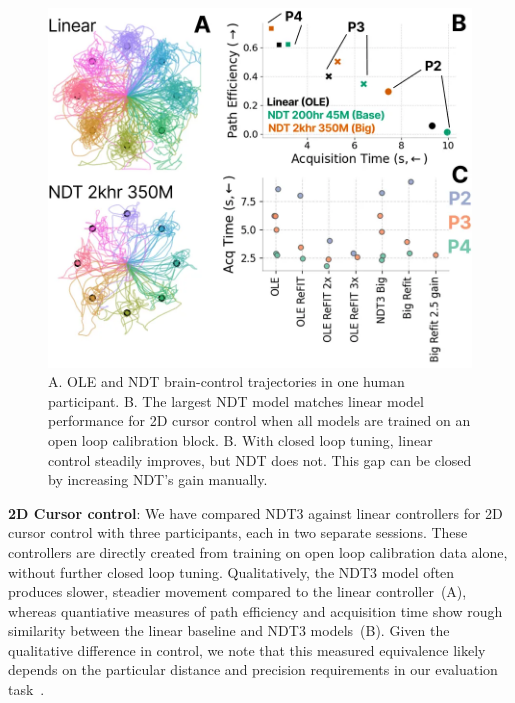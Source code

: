\documentclass[12pt,oneside]{report}
\begin{document}
\begin{figure}[h]
  \centering
  \includegraphics[width=0.8\linewidth]{ch3_cursor_control.png}
  \caption{A. OLE and NDT brain-control trajectories in one human participant. B. The largest NDT model matches linear model performance for 2D cursor control when all models are trained on an open loop calibration block. B. With closed loop tuning, linear control steadily improves, but NDT does not. This gap can be closed by increasing NDT's gain manually.}
  \label{fig:cursor}
\end{figure}

\textbf{2D Cursor control}: We have compared NDT3 against linear controllers for 2D cursor control with three participants, each in two separate sessions. These controllers are directly created from training on open loop calibration data alone, without further closed loop tuning. Qualitatively, the NDT3 model often produces slower, steadier movement compared to the linear controller~(A), whereas quantiative measures of path efficiency and acquisition time show rough similarity between the linear baseline and NDT3 models~(B). Given the qualitative difference in control, we note that this measured equivalence likely depends on the particular distance and precision requirements in our evaluation task~\citep{willett2017comparison}.
\end{document}
